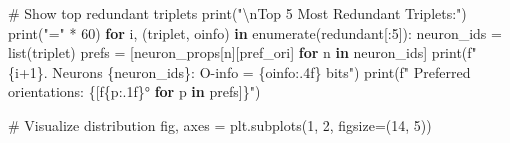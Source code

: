 \documentclass[
  11pt,
  letterpaper,
  oneside,
  openany]{book}
\newenvironment{Shaded}{\begin{snugshade}}{\end{snugshade}}
\newcommand{\BuiltInTok}[1]{\textcolor[rgb]{0.00,0.23,0.31}{#1}}
\newcommand{\CharTok}[1]{\textcolor[rgb]{0.13,0.47,0.30}{#1}}
\newcommand{\CommentTok}[1]{\textcolor[rgb]{0.37,0.37,0.37}{#1}}
\newcommand{\ControlFlowTok}[1]{\textcolor[rgb]{0.00,0.23,0.31}{\textbf{#1}}}
\newcommand{\DecValTok}[1]{\textcolor[rgb]{0.68,0.00,0.00}{#1}}
\newcommand{\KeywordTok}[1]{\textcolor[rgb]{0.00,0.23,0.31}{\textbf{#1}}}
\newcommand{\NormalTok}[1]{\textcolor[rgb]{0.00,0.23,0.31}{#1}}
\newcommand{\OperatorTok}[1]{\textcolor[rgb]{0.37,0.37,0.37}{#1}}
\newcommand{\SpecialCharTok}[1]{\textcolor[rgb]{0.37,0.37,0.37}{#1}}
\newcommand{\SpecialStringTok}[1]{\textcolor[rgb]{0.13,0.47,0.30}{#1}}
\newcommand{\StringTok}[1]{\textcolor[rgb]{0.13,0.47,0.30}{#1}}
\begin{document}
\begin{Shaded}
\begin{Highlighting}[]
\CommentTok{\# Show top redundant triplets}
\BuiltInTok{print}\NormalTok{(}\StringTok{"}\CharTok{\textbackslash{}n}\StringTok{Top 5 Most Redundant Triplets:"}\NormalTok{)}
\BuiltInTok{print}\NormalTok{(}\StringTok{"="} \OperatorTok{*} \DecValTok{60}\NormalTok{)}
\ControlFlowTok{for}\NormalTok{ i, (triplet, oinfo) }\KeywordTok{in} \BuiltInTok{enumerate}\NormalTok{(redundant[:}\DecValTok{5}\NormalTok{]):}
\NormalTok{    neuron\_ids }\OperatorTok{=} \BuiltInTok{list}\NormalTok{(triplet)}
\NormalTok{    prefs }\OperatorTok{=}\NormalTok{ [neuron\_props[n][}\StringTok{\textquotesingle{}pref\_ori\textquotesingle{}}\NormalTok{] }\ControlFlowTok{for}\NormalTok{ n }\KeywordTok{in}\NormalTok{ neuron\_ids]}
    \BuiltInTok{print}\NormalTok{(}\SpecialStringTok{f"}\SpecialCharTok{\{}\NormalTok{i}\OperatorTok{+}\DecValTok{1}\SpecialCharTok{\}}\SpecialStringTok{. Neurons }\SpecialCharTok{\{}\NormalTok{neuron\_ids}\SpecialCharTok{\}}\SpecialStringTok{: O{-}info = }\SpecialCharTok{\{}\NormalTok{oinfo}\SpecialCharTok{:.4f\}}\SpecialStringTok{ bits"}\NormalTok{)}
    \BuiltInTok{print}\NormalTok{(}\SpecialStringTok{f"   Preferred orientations: }\SpecialCharTok{\{}\NormalTok{[}\SpecialStringTok{f\textquotesingle{}}\SpecialCharTok{\{}\NormalTok{p}\SpecialCharTok{:.1f\}}\SpecialStringTok{°\textquotesingle{}} \ControlFlowTok{for}\NormalTok{ p }\KeywordTok{in}\NormalTok{ prefs]}\SpecialCharTok{\}}\SpecialStringTok{"}\NormalTok{)}

\CommentTok{\# Visualize distribution}
\NormalTok{fig, axes }\OperatorTok{=}\NormalTok{ plt.subplots(}\DecValTok{1}\NormalTok{, }\DecValTok{2}\NormalTok{, figsize}\OperatorTok{=}\NormalTok{(}\DecValTok{14}\NormalTok{, }\DecValTok{5}\NormalTok{))}


\end{Highlighting}
\end{Shaded}
\end{document}
